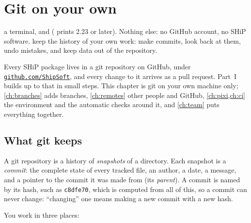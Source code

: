 \chapter{Git on your own}
\label{ch:git}

{a terminal, and  ( prints 2.23 or later).
Nothing else: no GitHub account, no SHiP software.}
{keep the history of your own work: make commits, look back at them, undo
mistakes, and keep data out of the repository.}

Every SHiP package lives in a git repository on GitHub, under
\href{https://github.com/ShipSoft}{\texttt{github.com/ShipSoft}}, and every
change to it arrives as a pull request. Part~I builds up to that in small
steps. This chapter is git on your own machine only; \cref{ch:branches} adds
branches, \cref{ch:remotes} other people and GitHub, \cref{ch:pixi,ch:ci} the
environment and the automatic checks around it, and \cref{ch:team} puts
everything together.

\section{What git keeps}

A git repository is a history of \emph{snapshots} of a directory. Each
snapshot is a \emph{commit}: the complete state of every tracked file, an
author, a date, a message, and a pointer to the commit it was made from (its
\emph{parent}). A commit is named by its hash, such as \texttt{c8dfe70}, which
is computed from all of this, so a commit can never change: ``changing'' one
means making a new commit with a new hash.

You work in three places:

\begin{center}
\end{center}

